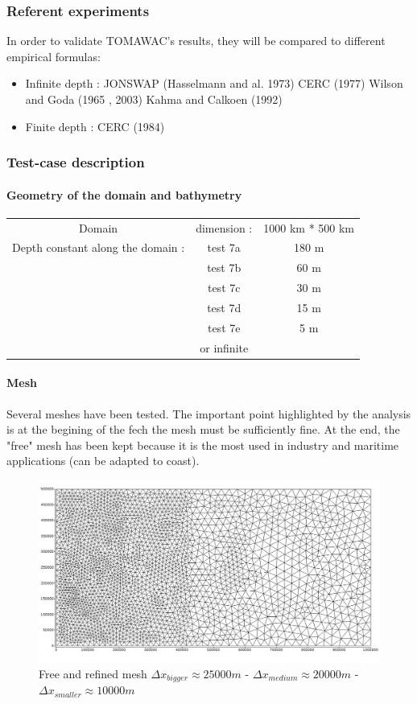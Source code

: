 \subsubsection{Referent experiments}
In order to validate TOMAWAC's results, they will be compared to different empirical formulas:
\begin{itemize}
\item Infinite depth :
\subitem JONSWAP (Hasselmann and al. 1973)
\subitem CERC (1977)
\subitem Wilson and Goda (1965 , 2003)
\subitem Kahma and Calkoen (1992)
\item Finite depth :
\subitem CERC (1984)
\end{itemize}
\subsubsection{Test-case description}

\paragraph{Geometry of the domain and bathymetry}
\begin{tabular}{ccc}
Domain & dimension :& 1000 km * 500 km\\
 Depth constant along the domain :& test 7a & 180 m\\
 & test 7b & 60 m\\ 
& test 7c & 30 m\\ 
& test 7d & 15 m\\
& test 7e & 5 m\\
 & or infinite\\
\end{tabular}
\paragraph{Mesh}
Several meshes have been tested. The important point highlighted by the analysis is at the begining of the fech the mesh must be sufficiently fine. At the end, the "free" mesh has been kept because it is the most used in industry and maritime applications (can be adapted to coast).
\quad \vspace{3cm}
\begin{figure}[H]
  \centering
    \includegraphics[scale = 0.35]{freemesh.png}
      \caption{Free and refined mesh $\Delta x_{bigger} \approx 25 000 m$ - $\Delta x_{medium} \approx 20 000 m$ - $\Delta x_{smaller} \approx 10 000 m$}
\end{figure}

